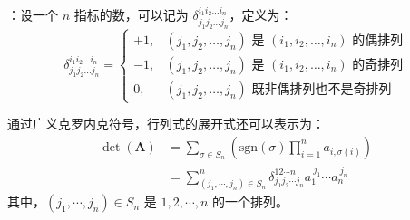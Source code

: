 \begin{definition}：设一个 $n$ 指标的数，可以记为 $\delta_{j_1 j_2 \ldots j_n}^{i_1 i_2 \ldots i_n}$，定义为：
\[
    \delta_{j_1 j_2 \ldots j_n}^{i_1 i_2 \ldots i_n} = \begin{cases}
        +1, & (j_1, j_2, \ldots, j_n) \text{ 是 } (i_1, i_2, \ldots, i_n) \text{ 的偶排列} \\
        -1, & (j_1, j_2, \ldots, j_n) \text{ 是 } (i_1, i_2, \ldots, i_n) \text{ 的奇排列} \\
        0, & (j_1, j_2, \ldots, j_n) \text{ 既非偶排列也不是奇排列}
    \end{cases}
\]
\label{def:generalized_kronecker_delta}
\end{definition}

\begin{example}
    通过广义克罗内克符号，行列式的展开式还可以表示为：
    \begin{align}
        \det(\mathbf{A}) &= \sum_{\sigma \in S_n} \left( \mathrm{sgn}(\sigma) \prod_{i=1}^{n} a_{i,\sigma(i)} \right) \\
        &= \sum_{(j_1, \cdots, j_n)\in S_n}^{n} \delta^{1 2 \cdots n}_{j_1 j_2 \cdots j_n}  a_{1}^{\ j_1}\cdots a_{n}^{\ j_n}
        \label{eq:generalized_kronecker_determinant}
    \end{align}
    其中，$(j_1,\cdots,j_n)\in S_n$ 是 $1,2,\cdots,n$ 的一个排列。
    \label{ex:generalized_kronecker_determinant}
\end{example}

\newpage